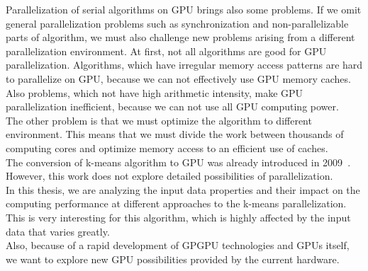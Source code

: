 Parallelization of serial algorithms on GPU brings also some problems. If we omit general parallelization problems such as synchronization and non-parallelizable parts of algorithm, we must also challenge new problems arising from a different parallelization environment. At first, not all algorithms are good for GPU parallelization. Algorithms, which have irregular memory access patterns are hard to parallelize on GPU, because we can not effectively use GPU memory caches. Also problems, which not have high arithmetic intensity, make GPU parallelization inefficient, because we can not use all GPU computing power.\\
The other problem is that we must optimize the algorithm to different environment. This means that we must divide the work between thousands of computing cores and optimize memory access to an efficient use of caches.\\

The conversion of k-means algorithm to GPU was already introduced in 2009~\cite{Hong09}. However, this work does not explore detailed possibilities of parallelization.\\
In this thesis, we are analyzing the input data properties and their impact on the computing performance at different approaches to the k-means parallelization. This is very interesting for this algorithm, which is highly affected by the input data that varies greatly. \\
Also, because of a rapid development of GPGPU technologies and GPUs itself, we want to explore new GPU possibilities provided by the current hardware.\\



